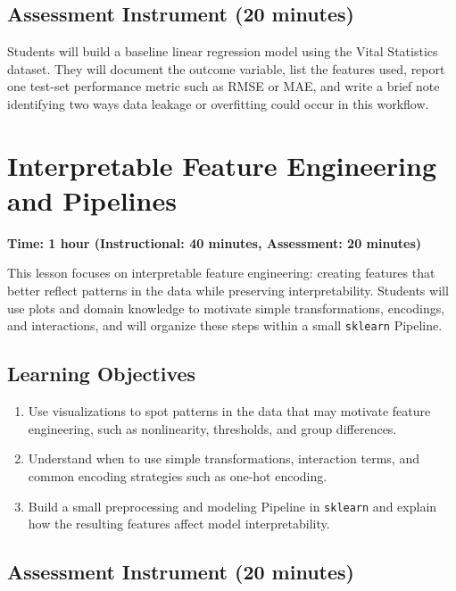 \subsection{Assessment Instrument (20 minutes)}

Students will build a baseline linear regression model using the Vital Statistics dataset. They will document the outcome variable, list the features used, report one test-set performance metric such as RMSE or MAE, and write a brief note identifying two ways data leakage or overfitting could occur in this workflow.

\section{Interpretable Feature Engineering and Pipelines}
\label{sec:4.2}

\textbf{Time: 1 hour (Instructional: 40 minutes, Assessment: 20 minutes)}

\noindent This lesson focuses on interpretable feature engineering: creating features that better reflect patterns in the data while preserving interpretability. Students will use plots and domain knowledge to motivate simple transformations, encodings, and interactions, and will organize these steps within a small \verb|sklearn| Pipeline.

\subsection{Learning Objectives}

\begin{enumerate}
    \item Use visualizations to spot patterns in the data that may motivate feature engineering, such as nonlinearity, thresholds, and group differences.
    \item Understand when to use simple transformations, interaction terms, and common encoding strategies such as one-hot encoding.
    \item Build a small preprocessing and modeling Pipeline in \verb|sklearn| and explain how the resulting features affect model interpretability.
\end{enumerate}

\subsection{Assessment Instrument (20 minutes)}

